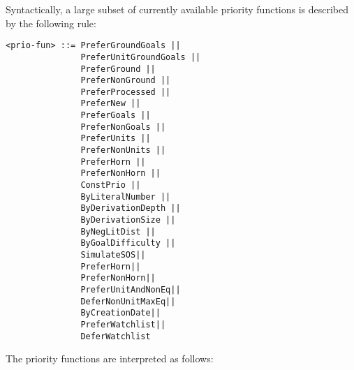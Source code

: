 \documentclass{article}
\begin{document}
Syntactically, a large subset of currently available priority
functions is described by the following rule:

\begin{verbatim}
<prio-fun> ::= PreferGroundGoals ||
               PreferUnitGroundGoals ||
               PreferGround ||
               PreferNonGround ||
               PreferProcessed ||
               PreferNew ||
               PreferGoals ||
               PreferNonGoals ||
               PreferUnits ||
               PreferNonUnits ||
               PreferHorn ||
               PreferNonHorn ||
               ConstPrio ||
               ByLiteralNumber ||
               ByDerivationDepth ||
               ByDerivationSize ||
               ByNegLitDist ||
               ByGoalDifficulty ||
               SimulateSOS||
               PreferHorn||
               PreferNonHorn||
               PreferUnitAndNonEq||
               DeferNonUnitMaxEq||
               ByCreationDate||
               PreferWatchlist||
               DeferWatchlist
\end{verbatim}

The priority functions are interpreted as follows:
\end{document}
